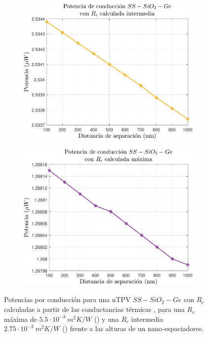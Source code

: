 \begin{figure}[H]
	\centering
	\begin{subfigure}[b]{0.49\textwidth}
		\centering
			\includegraphics[width=1.00\textwidth]{Prc_SsSiO2Ge_Inter.pdf}
		\caption{ }
		\label{fig:Prc_SsSiO2Ge_Inter}
	\end{subfigure}
	\hfill
	\begin{subfigure}[b]{0.49\textwidth}
		\centering
			\includegraphics[width=1.00\textwidth]{Prc_SsSiO2Ge_Max.pdf}
		\caption{ }
		\label{fig:Prc_SsSiO2Ge_Max}
	\end{subfigure}
	\caption{Potencias por conducción para una nTPV $SS-SiO_2-Ge$ con $R_c$ calculadas a partir de las conductancias térmicas \cite{experimental_Rc_SS}, para una $R_c$ máxima de  $5.5\cdot 10^{-3} \ m^2 K/W$ () y una $R_c$ intermedia $2.75\cdot 10^{-3} \ m^2 K/W$ () frente a las alturas de un nano-espaciadores.}
	\label{fig:Pcond1_SsSiO2Ge}
\end{figure}
